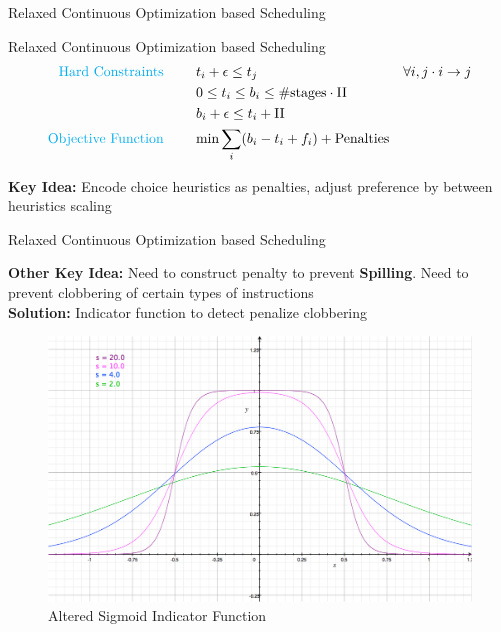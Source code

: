 \documentclass{beamer}
\begin{document}
\begin{darkframes}
\begin{frame}{Relaxed Continuous Optimization based Scheduling}
\end{frame}

\begin{frame}{Relaxed Continuous Optimization based Scheduling}
    \begin{align}
    \text{\color{cyan} Hard Constraints \qquad}  & t_i + \epsilon \leq t_j \qquad & \forall i,j \cdot i \rightarrow j \\
								 & 0 \leq t_i \leq b_i \leq \#\text{stages} \cdot \textrm{II}  & \\
								 & b_i + \epsilon \leq t_i + \textrm{II} \\
    \text{\color{cyan} Objective Function \qquad}   & \text{min} \sum_{i} (b_i - t_i + f_i) + \text{Penalties}
    \end{align}
    
    {\bf \color{green} Key Idea:} Encode choice heuristics as penalties, adjust preference by between heuristics scaling
\end{frame}

\begin{frame}{Relaxed Continuous Optimization based Scheduling}

    {\bf \color{green} Other Key Idea:} Need to construct penalty to prevent {\bf \color{cyan} Spilling}. Need to prevent clobbering of certain types of instructions \\
    {\bf \color{green} Solution:} Indicator function to detect penalize clobbering
    \begin{figure}
        \includegraphics[scale=0.2]{figures/sigmoid}
        \caption{Altered Sigmoid Indicator Function}
    \end{figure}

\end{frame}


\end{darkframes}
\end{document}

